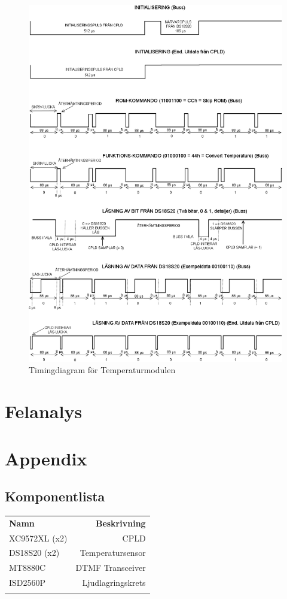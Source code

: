 \documentclass[a4paper,11pt]{article}
\begin{document}
	\begin{figure}[h!tb]
	  \centering
	      \includegraphics[scale=0.5, angle=0]{TempTiming.png}
	  	\caption{Timingdiagram för Temperaturmodulen}
	\end{figure}

\section{Felanalys}

\section{Appendix}

	\subsection{Komponentlista}
	\begin{tabular}{l r}
		\\{\bf Namn} & {\bf Beskrivning}\\
		XC9572XL (x2) & CPLD\\
		DS18S20 (x2) & Temperatursensor\\
		MT8880C & DTMF Transceiver\\
		ISD2560P & Ljudlagringskrets\\\\
	\end{tabular}
\end{document}
